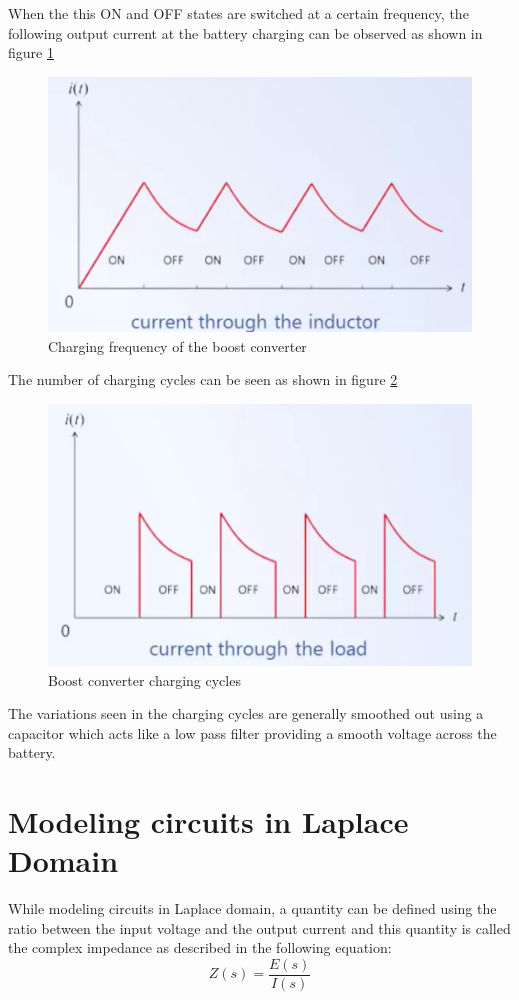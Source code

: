 When the this ON and OFF states are switched at a certain frequency, the following output current at the battery charging can be observed as shown in figure \ref{Fig_Fund_ELK_Boost_Performance_f}
\begin{figure}[h!]
	\centering
	\includegraphics[width=0.75\linewidth]{Bilder/Fund_ELK_Boost_Charging_f}
	\caption{Charging frequency of the boost converter}
	\label{Fig_Fund_ELK_Boost_Performance_f}
\end{figure}
\newpage
The number of charging cycles can be seen as shown in figure \ref{Fig_Fund_ELK_Boost_Charging_Cycles}
\begin{figure}[h!]
	\centering
	\includegraphics[width=0.75\linewidth]{Bilder/Fund_ELK_Boost_Charging_Cycles}
	\caption{Boost converter charging cycles}
	\label{Fig_Fund_ELK_Boost_Charging_Cycles}
\end{figure}

The variations seen in the charging cycles are generally smoothed out using a capacitor which acts like a low pass filter providing a smooth voltage across the battery. 

\section{Modeling circuits in Laplace Domain}

While modeling circuits in Laplace domain, a quantity can be defined using the ratio between the input voltage and the output current and this quantity is called the complex impedance as described in the following equation:
\begin{equation}
	Z(s) = \frac{E(s)}{I(s)}
\end{equation}

